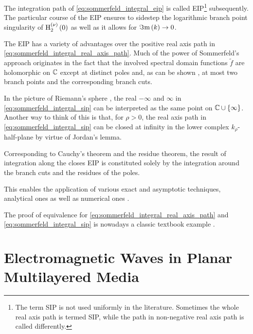 The integration path of \eqref{eq:sommerfeld_integral_eip} is called
\acf{EIP}\footnote{
	The term \acl{SIP} is not used uniformly in the literature.
	Sometimes the whole real axis path is termed \ac{SIP}, while the
	path in non-negative real axis path is called differently.
	}
subsequently.
The particular course of the \ac{EIP} ensures to sidestep the logarithmic
branch point singularity of $\operatorname{H}_{2}^{\left( \nu \right)}\left(0\right)$ \cite{Olver2010}
as well as it allows for $\Im\mathrm{m}\left(k\right) \to 0$.

The \ac{EIP} has a variety of advantages over the positive real axis path in
\eqref{eq:sommerfeld_integral_real_axis_path}.
Much of the power of Sommerfeld's approach originates in the fact that the
involved spectral domain functions $\tilde{f}$ are holomorphic on $\mathbb{C}$ except at 
distinct poles and, as can be shown \cite{Michalski2016b}, at most two
branch points and the corresponding branch cuts.

In the picture of Riemann's sphere \cite[180]{Meyberg2006}, the real
$-\infty$ and $\infty$ in \eqref{eq:sommerfeld_integral_sip} can be interpreted
as the same point on $\mathbb{C} \cup \left\{\infty\right\}$.
Another way to think of this is that, for $\rho > 0$, the real axis path in
\eqref{eq:sommerfeld_integral_sip} can be closed at infinity in the lower
complex $k_\rho$-half-plane by virtue of Jordan's lemma.

Corresponding to Cauchy's theorem and the residue theorem, the result of
integration along the closes \ac{EIP} is constituted solely by the integration
around the branch cuts and the residues of the poles.

This enables the application of various exact and asymptotic techniques,
analytical ones as well as numerical ones
\cite{Sommerfeld1964,Chew1999,Michalski1985a,Michalski2016b}.

The proof of equivalence for \eqref{eq:sommerfeld_integral_real_axis_path} and
\eqref{eq:sommerfeld_integral_sip} is nowadays a classic textbook example
\cite[203]{Sommerfeld1964}.













\chapter{Electromagnetic Waves in Planar Multilayered Media}
\label{ch:em_case}







